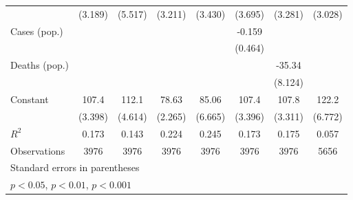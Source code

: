 \documentclass{article}
\begin{document}
{\begin{longtable}{l*{7}{c}}
                &  (3.189)         &  (5.517)         &  (3.211)         &  (3.430)         &  (3.695)         &  (3.281)         &  (3.028)         \\
Cases (pop.)    &                  &                  &                  &                  &   -0.159         &                  &                  \\
                &                  &                  &                  &                  &  (0.464)         &                  &                  \\
Deaths (pop.)   &                  &                  &                  &                  &                  &   -35.34\sym{***}&                  \\
                &                  &                  &                  &                  &                  &  (8.124)         &                  \\
Constant        &    107.4\sym{***}&    112.1\sym{***}&    78.63\sym{***}&    85.06\sym{***}&    107.4\sym{***}&    107.8\sym{***}&    122.2\sym{***}\\
                &  (3.398)         &  (4.614)         &  (2.265)         &  (6.665)         &  (3.396)         &  (3.311)         &  (6.772)         \\
\hline
\(R^{2}\)       &    0.173         &    0.143         &    0.224         &    0.245         &    0.173         &    0.175         &    0.057         \\
Observations    &     3976         &     3976         &     3976         &     3976         &     3976         &     3976         &     5656         \\
\hline\hline
\multicolumn{8}{l}{\footnotesize Standard errors in parentheses}\\
\multicolumn{8}{l}{\footnotesize \sym{*} \(p<0.05\), \sym{**} \(p<0.01\), \sym{***} \(p<0.001\)}\\
\end{longtable}
}
\end{document}
